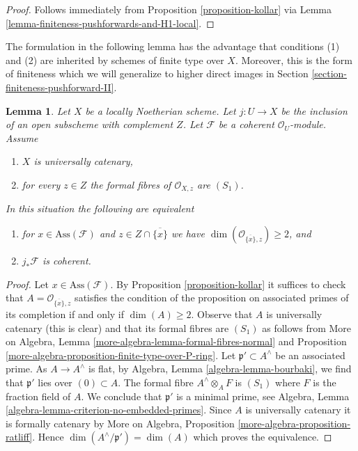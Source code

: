 \documentclass{stacks-project}
\theoremstyle{plain}
\newtheorem{lemma}[subsection]{Lemma}
\theoremstyle{definition}
\theoremstyle{remark}
\numberwithin{equation}{subsection}
\begin{document}
\begin{proof}
Follows immediately from Proposition \ref{proposition-kollar}
via Lemma \ref{lemma-finiteness-pushforwards-and-H1-local}.
\end{proof}

\noindent
The formulation in the following lemma has the advantage that conditions
(1) and (2) are inherited by schemes of finite type over $X$.
Moreover, this is the form of finiteness which we will generalize
to higher direct images in Section \ref{section-finiteness-pushforward-II}.

\begin{lemma}
\label{lemma-finiteness-pushforward-general}
Let $X$ be a locally Noetherian scheme.
Let $j : U \to X$ be the inclusion of an
open subscheme with complement $Z$. Let $\mathcal{F}$ be a coherent
$\mathcal{O}_U$-module. Assume
\begin{enumerate}
\item $X$ is universally catenary,
\item for every $z \in Z$ the formal fibres of $\mathcal{O}_{X, z}$
are $(S_1)$.
\end{enumerate}
In this situation the following are equivalent
\begin{enumerate}
\item[(a)] for $x \in \text{Ass}(\mathcal{F})$ and
$z \in Z \cap \overline{\{x\}}$ we have
$\dim(\mathcal{O}_{\overline{\{x\}}, z}) \geq 2$, and
\item[(b)] $j_*\mathcal{F}$ is coherent.
\end{enumerate}
\end{lemma}

\begin{proof}
Let $x \in \text{Ass}(\mathcal{F})$. By Proposition \ref{proposition-kollar}
it suffices to check that $A = \mathcal{O}_{\overline{\{x\}}, z}$ satisfies
the condition of the proposition on associated primes of its completion
if and only if $\dim(A) \geq 2$.
Observe that $A$ is universally catenary (this is clear)
and that its formal fibres are $(S_1)$ as follows from
More on Algebra, Lemma \ref{more-algebra-lemma-formal-fibres-normal} and
Proposition \ref{more-algebra-proposition-finite-type-over-P-ring}.
Let $\mathfrak p' \subset A^\wedge$ be an associated prime.
As $A \to A^\wedge$ is flat,
by Algebra, Lemma \ref{algebra-lemma-bourbaki},
we find that $\mathfrak p'$ lies over $(0) \subset A$.
The formal fibre $A^\wedge \otimes_A F$ is $(S_1)$ where $F$ is
the fraction field of $A$. We conclude that $\mathfrak p'$ is a
minimal prime, see
Algebra, Lemma \ref{algebra-lemma-criterion-no-embedded-primes}.
Since $A$ is universally catenary it is formally catenary
by More on Algebra, Proposition \ref{more-algebra-proposition-ratliff}.
Hence $\dim(A^\wedge/\mathfrak p') = \dim(A)$ which
proves the equivalence.
\end{proof}
\end{document}
